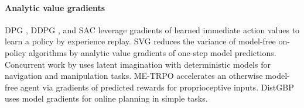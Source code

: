 \paragraph{Analytic value gradients}

DPG \citep{silver2014dpg}, DDPG \citep{lillicrap2015ddpg}, and SAC \citep{haarnoja2018sac} leverage gradients of learned immediate action values to learn a policy by experience replay. SVG \citep{heess2015svg} reduces the variance of model-free on-policy algorithms by analytic value gradients of one-step model predictions. Concurrent work by \citet{byravan2019ivg} uses latent imagination with deterministic models for navigation and manipulation tasks. ME-TRPO \citep{kurutach2018modeltrpo} accelerates an otherwise model-free agent via gradients of predicted rewards for proprioceptive inputs. DistGBP \citep{henaff2017planbybackprop,henaff2019planbybackprop} uses model gradients for online planning in simple tasks.